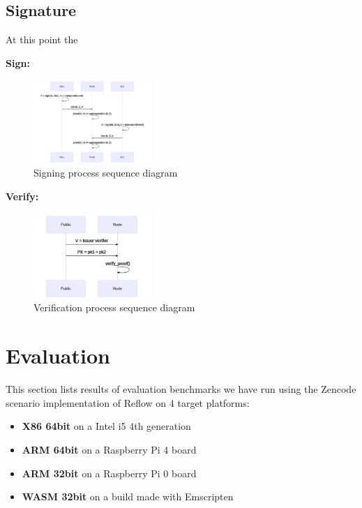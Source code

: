 \documentclass[twocolumn]{article}
\begin{document}
\subsection{Signature}
At this point the 

\textbf{Sign:}

\begin{figure}
  \caption{Signing process sequence diagram}
  \centering
  \includegraphics[width=0.4\textwidth]{sign-seq}
\end{figure}

\textbf{Verify:}

\begin{figure}
  \caption{Verification process sequence diagram}
  \centering
  \includegraphics[width=0.4\textwidth]{verify-seq}
\end{figure}




\section{Evaluation}
\label{sec:evaluation}

This section lists results of evaluation benchmarks we have run using the Zencode scenario implementation of Reflow on 4 target platforms:
\begin{itemize}
  \item \textbf{X86 64bit} on a Intel i5 4th generation
  \item \textbf{ARM 64bit} on a Raspberry Pi 4 board
  \item \textbf{ARM 32bit} on a Raspberry Pi 0 board
  \item \textbf{WASM 32bit} on a build made with Emscripten
\end{itemize}
\end{document}
